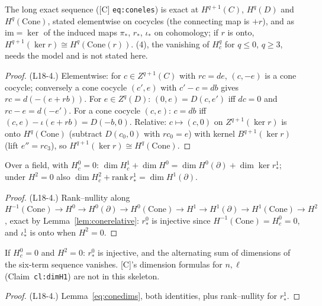 \begin{lemma}\label{lem:conerelative}
  \leanok
  The long exact sequence ([C] \texttt{eq:coneles}) is exact at $H^{q+1}(C)$, $H^q(D)$ and $H^q(\mathrm{Cone})$, stated elementwise on cocycles (the connecting map
  is $+r$), and as $\mathrm{im}=\ker$ of the induced maps $\pi_*$, $r_*$, $\iota_*$ on cohomology; if $r$ is onto,
  $H^{q+1}(\ker r)\cong H^q(\mathrm{Cone}(r))$. (4), the vanishing of $H^q_c$ for $q\le0$, $q\ge3$, needs the model and is not
  stated here.
\end{lemma}
\begin{proof}
  \leanok
  (L18-4.) Elementwise: for $c\in Z^{q+1}(C)$ with $rc=de$, $(c,-e)$ is a cone cocycle; conversely a cone cocycle $(c',e)$ with
  $c'-c=db$ gives $rc=d(-(e+rb))$. For $e\in Z^q(D)$: $(0,e)=D(c,e')$ iff $dc=0$ and $rc-e=d(-e')$. For a cone cocycle $(c,e)$:
  $c=db$ iff $(c,e)-\iota(e+rb)=D(-b,0)$. Relative: $c\mapsto(c,0)$ on $Z^{q+1}(\ker r)$ is onto $H^q(\mathrm{Cone})$ (subtract
  $D(c_0,0)$ with $rc_0=e$) with kernel $B^{q+1}(\ker r)$ (lift $e''=rc_3$), so $H^{q+1}(\ker r)\cong H^q(\mathrm{Cone})$.
\end{proof}

\begin{lemma}\label{eq:conedims}
  \leanok
  Over a field, with $H^0_c=0$: $\dim H^1_c+\dim H^0=\dim H^0(\partial)+\dim\ker r^1_*$; under $H^2=0$ also
  $\dim H^2_c+\mathrm{rank}\,r^1_*=\dim H^1(\partial)$.
\end{lemma}
\begin{proof}
  \leanok
  (L18-4.) Rank--nullity along $H^{-1}(\mathrm{Cone})\to H^0\to H^0(\partial)\to H^0(\mathrm{Cone})\to H^1\to H^1(\partial)\to
  H^1(\mathrm{Cone})\to H^2$, exact by Lemma~\ref{lem:conerelative}: $r^0_*$ is injective since $H^{-1}(\mathrm{Cone})=H^0_c=0$,
  and $\iota^1_*$ is onto when $H^2=0$.
\end{proof}

\begin{lemma}\label{cl:les}
  \leanok
  If $H^0_c=0$ and $H^2=0$: $r^0_*$ is injective, and the alternating sum of dimensions of the six-term sequence vanishes.
  [C]'s dimension formulas for $n,\ell$ (Claim~\texttt{cl:dimH1}) are not in this skeleton.
\end{lemma}
\begin{proof}
  \leanok
  (L18-4.) Lemma~\ref{eq:conedims}, both identities, plus rank--nullity for $r^1_*$.
\end{proof}


